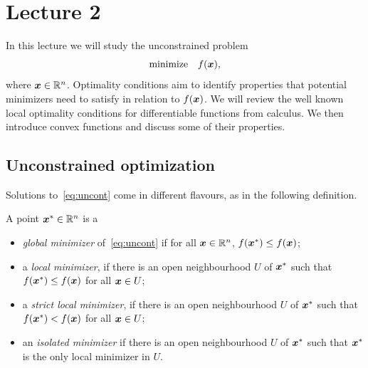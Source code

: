%
%
% 


\chapter*{Lecture 2}
\addtocounter{chapter}{2}


In this lecture we will study the unconstrained problem
\begin{equation}\label{eq:uncont}
 \text{minimize}\quad f(\bm{x}),
\end{equation}
where $\bm{x}\in \mathbb{R}^n$. Optimality conditions aim to identify properties that potential minimizers need to satisfy in relation to $f(\bm{x})$. We will review the well known local optimality conditions for differentiable functions from calculus. We then introduce convex functions and discuss some of their properties.

\section{Unconstrained optimization}
Solutions to~\eqref{eq:uncont} come in different flavours, as in the following definition.

\begin{definition}
A point $\bm{x}^*\in \mathbb{R}^n$ is a
\begin{itemize}
 \item  {\em global minimizer} of~\eqref{eq:uncont} if for all $\bm{x}\in \mathbb{R}^n$, $f(\bm{x}^*)\leq f(\bm{x})$;
 \item a {\em local minimizer}, if there is an open neighbourhood $U$ of $\bm{x}^*$ such that $f(\bm{x}^*)\leq f(\bm{x})$ for all $\bm{x}\in U$;
 \item a {\em strict local minimizer}, if there is an open neighbourhood $U$ of $\bm{x}^*$ such that $f(\bm{x}^*)<f(\bm{x})$ for all $\bm{x}\in U$;
 \item an {\em isolated minimizer} if there is an open neighbourhood $U$ of $\bm{x}^*$ such that $\bm{x}^*$ is the only local minimizer in $U$.
 \end{itemize}
\end{definition}

